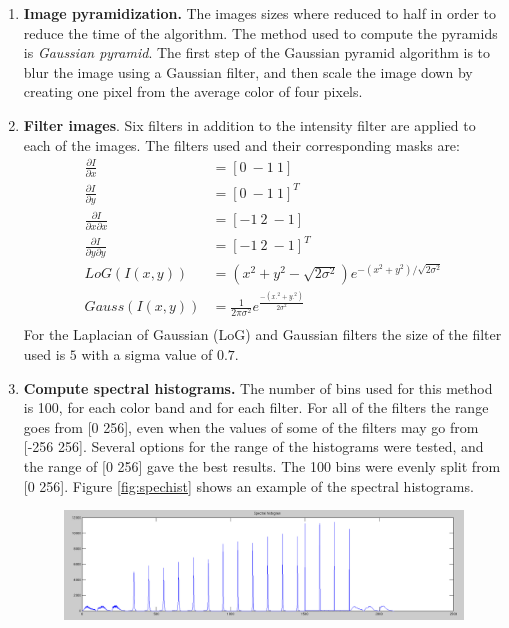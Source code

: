 \documentclass[a4paper,12pt]{article}
\begin{document}
\begin{enumerate}
    \item \textbf{Image pyramidization. } The images sizes where reduced
        to half in order to reduce the time of the algorithm. The method used
        to compute the pyramids is \emph{Gaussian pyramid}. The first
        step of the Gaussian pyramid algorithm is to blur the image 
        using a Gaussian filter, and then scale the image down by 
        creating one pixel from the average color of four pixels.
    \item \textbf{Filter images}. Six filters in addition to the intensity
        filter are applied to each of the images. The filters 
        used and their corresponding masks are:
        \begin{equation}
            \begin{split}
                \frac{\partial I}{\partial x} & =  [0~-1~1] \\
                \frac{\partial I}{\partial y} & =  [0~-1~1]^T \\
                \frac{\partial I}{\partial x \partial x} & = [-1~2~-1] \\
                \frac{\partial I}{\partial y \partial y} & = [-1~2~-1]^T \\
                LoG(I(x,y))  & = ( x^2 + y^2 - \sqrt{2\sigma^2} ) e^{ -(x^2+y^2)/\sqrt{2\sigma^2}}\\
                Gauss(I(x,y))  & = \frac{1}{2 \pi \sigma^2} e^{ \frac{-(x.^2+y.^2)}{2\sigma^2}}\\
            \end{split}
        \end{equation}
        For the Laplacian of Gaussian (LoG) and Gaussian filters the size of the filter
        used is $5$ with a sigma value of $0.7$.
    \item \textbf{Compute spectral histograms.} The number of bins used
        for this method is 100, for each color band and for each filter. 
        For all of the filters the range goes from [0 256], even when the values of some
        of the filters may go from [-256 256]. Several options for the range of the 
        histograms were tested, and the range of [0 256] gave the best results. 
        The 100 bins were evenly split from [0 256].
        Figure \ref{fig:spechist} shows an example of the spectral histograms. 
        \begin{figure}[h]
            \centering
            \includegraphics[totalheight=.18\textheight]{./Images/SpectralHist.png}

\end{figure}
\end{enumerate}
\end{document}
